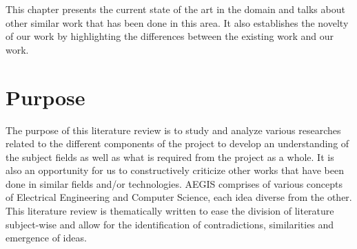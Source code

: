 This chapter presents the current state of the art in the domain and talks about other similar work that has been done in this area. It also establishes the novelty of our work by highlighting the differences between the existing work and our work.

\section{Purpose}
The purpose of this literature review is to study and analyze various researches related to the different components of the project to develop an understanding of the subject fields as well as what is required from the project as a whole. It is also an opportunity for us to constructively criticize other works that have been done in similar fields and/or technologies. AEGIS comprises of various concepts of Electrical Engineering and Computer Science, each idea diverse from the other. This literature review is thematically written to ease the division of literature subject-wise and allow for the identification of contradictions, similarities and emergence of ideas. 

